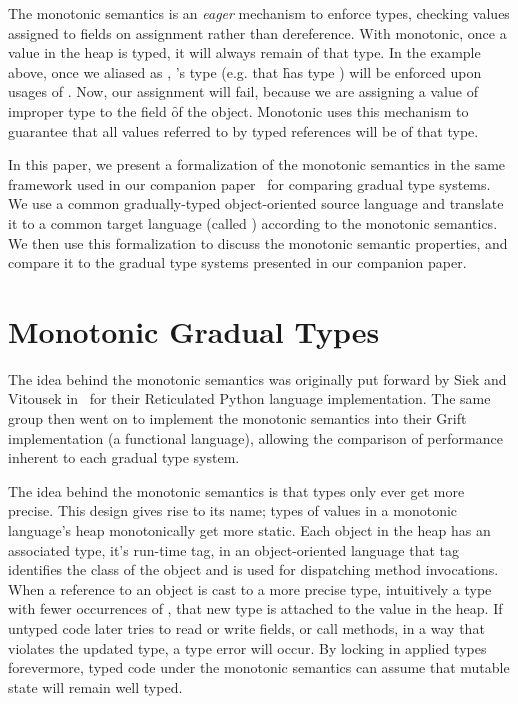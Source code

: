 \documentclass[sigconf]{acmart}
\begin{document}
The monotonic semantics is an \emph{eager} mechanism to enforce types,
checking values assigned to fields on assignment rather than dereference. With
monotonic, once a value in the heap is typed, it will always remain of that
type. In the example above, once we aliased \x as \xp, \xp's type (e.g. that
\f has type ) will be enforced upon usages of \x. Now, our assignment
 will fail, because we are assigning a value of improper
type to the field \f of the object. Monotonic uses this mechanism to guarantee
that all values referred to by typed references will be of that type.

In this paper, we present a formalization of the monotonic semantics in the
same framework used in our companion paper~\cite{us} for comparing gradual
type systems. We use a common gradually-typed object-oriented source language
and translate it to a common target language (called \kafka) according to the
monotonic semantics. We then use this formalization to discuss the monotonic
semantic properties, and compare it to the gradual type systems presented
in our companion paper.

\section{Monotonic Gradual Types}

The idea behind the monotonic semantics was originally put forward by Siek
and Vitousek in~\cite{siek14} for their Reticulated Python language
implementation. The same group then went on to implement the monotonic
semantics into their Grift implementation (a functional language), allowing
the comparison of performance inherent to each gradual type system.

The idea behind the monotonic semantics is that types only ever get more
precise. This design gives rise to its name; types of values in a monotonic
language's heap monotonically get more static. Each object in the heap has
an associated type, it's run-time tag, in an object-oriented language that
tag identifies the class of the object and is used for dispatching method
invocations. When a reference to an object is cast to a more precise type,
intuitively a type with fewer occurrences of \any, that new type is attached
to the value in the heap.  If untyped code later tries to read or write
fields, or call methods, in a way that violates the updated type, a type
error will occur. By locking in applied types forevermore, typed code under
the monotonic semantics can assume that mutable state will remain well
typed.
\end{document}
